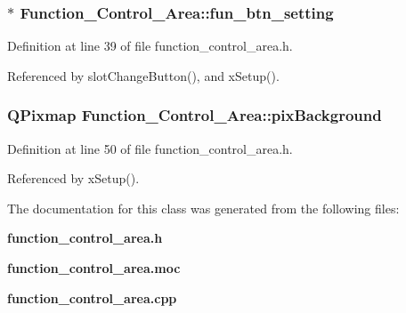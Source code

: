 \subsubsection{ $\ast$ {\bf Function\_\-Control\_\-Area::fun\_\-btn\_\-setting}}\label{classFunction__Control__Area_Function__Control__Areao4}




Definition at line 39 of file function\_\-control\_\-area.h.

Referenced by slot\-Change\-Button(), and x\-Setup().
\subsubsection{\setlength{\rightskip}{0pt plus 5cm}QPixmap {\bf Function\_\-Control\_\-Area::pix\-Background}\hspace{0.3cm}{\tt  [private]}}\label{classFunction__Control__Area_Function__Control__Arear1}




Definition at line 50 of file function\_\-control\_\-area.h.

Referenced by x\-Setup().

The documentation for this class was generated from the following files:\begin{CompactItemize}
\item 
{\bf function\_\-control\_\-area.h}\item 
{\bf function\_\-control\_\-area.moc}\item 
{\bf function\_\-control\_\-area.cpp}\end{CompactItemize}
